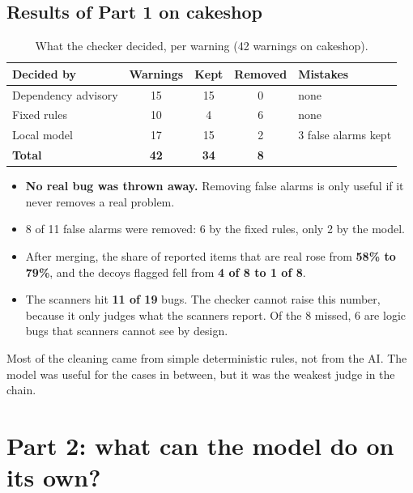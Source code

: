 \documentclass[11pt,a4paper]{article}
\begin{document}
\subsection{Results of Part 1 on cakeshop}

\begin{table}[H]
\centering
\caption{What the checker decided, per warning (42 warnings on cakeshop).}
\begin{tabular}{@{}l c c c l@{}}
\toprule
\textbf{Decided by} & \textbf{Warnings} & \textbf{Kept} & \textbf{Removed} & \textbf{Mistakes} \\
\midrule
Dependency advisory & 15 & 15 & 0 & none \\
Fixed rules & 10 & 4 & 6 & none \\
Local model & 17 & 15 & 2 & 3 false alarms kept \\
\midrule
\textbf{Total} & \textbf{42} & \textbf{34} & \textbf{8} & \\
\bottomrule
\end{tabular}
\end{table}

\begin{itemize}
  \item \textbf{No real bug was thrown away.} Removing false alarms is only useful if it never removes a
        real problem.
  \item 8 of 11 false alarms were removed: 6 by the fixed rules, only 2 by the model.
  \item After merging, the share of reported items that are real rose from \textbf{58\% to 79\%}, and the
        decoys flagged fell from \textbf{4 of 8 to 1 of 8}.
  \item The scanners hit \textbf{11 of 19} bugs. The checker cannot raise this number, because it only judges
        what the scanners report. Of the 8 missed, 6 are logic bugs that scanners cannot see by design.
\end{itemize}

\begin{lesson}
Most of the cleaning came from simple deterministic rules, not from the AI. The model was useful for the
cases in between, but it was the weakest judge in the chain.
\end{lesson}

\section{Part 2: what can the model do on its own?}
\label{sec:hunt}
\end{document}
